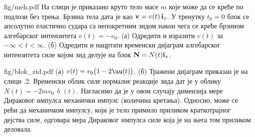 
\begin{slikaDesno}[.833]{fig/meh.pdf}
\PID 
На слици је приказано круто тело масе $m$ 
које може да се креће по подлози без трења. 
Брзина тела дата је као ${\bf v} = v(t) \, 
{\bf i}_x$. У тренутку $t_0 = 0$ блок се 
апсолутно еластично судара са 
непокретним зидом након чега 
се креће брзином алгебарског интензитета 
$v(t) = -v_0$. (а) Одредити и 
изразити $v(t)$ за $-\infty< t < \infty$. 
(б) Одредити и нацртати временски дијаграм
алгебарског интензитета  
силе којом зид делује на блок ${\bf N} = N(t) 
{\bf i}_x$.
\end{slikaDesno}
\vspace*{5mm}

\begin{slikaDesno}[1]{fig/blok_zid.pdf}
\hspace*{5mm}
\REZULTAT 
(а) $v(t) = v_0 \bigl(1 - 2\uu(t)\bigr)$.
(б) Тражени дијаграм приказан је на слици \ID.2.
Временски облик силе нормалне реакције зида дат је у облику 
$N(t) = -2mv_0 \, \updelta(t)$. Нагласимо да је у овом случају димензија
мере Дираковог импулса механички импулс (количина кретања). Односно, може се рећи да механичком импулсу, 
који је тело примило приликом краткотрајног дејства силе, одговара мера Дираковог импулса силе која је на 
њега том приликом деловала.
\end{slikaDesno}